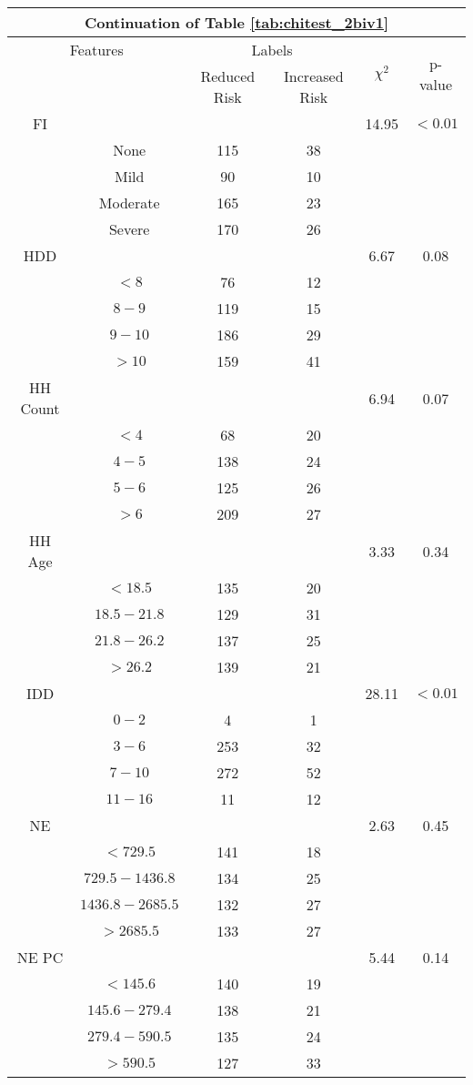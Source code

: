 \begin{table}
\centering
\label{tab:chitest_2biv1_cont}
\begin{tabular}{c c | c c| c | c}
\hline
\multicolumn{6}{c}{Continuation of Table \ref{tab:chitest_2biv1}}\\ 
\hline
\multicolumn{2}{c|}{Features}& \multicolumn{2}{c|}{Labels}& \multirow{2}{*}{$\chi^2$} & \multirow{2}{*}{p-value}\\ 
& & Reduced Risk & Increased Risk & & \\ 
\hline
FI &  &  & & 14.95 & $< 0.01$ \\ 
& None & 115 & 38& & \\ 
& Mild & 90 & 10& & \\ 
& Moderate & 165 & 23& & \\ 
& Severe & 170 & 26& & \\ 
\hline 
HDD &  &  & & 6.67 & 0.08 \\ 
& $< 8$ & 76 & 12& & \\ 
& $8-9$ & 119 & 15& & \\ 
& $9-10$ & 186 & 29& & \\ 
& $> 10$ & 159 & 41& & \\ 
\hline 
HH Count &  &  & & 6.94 & 0.07 \\ 
& $< 4$ & 68 & 20& & \\ 
& $4-5$ & 138 & 24& & \\ 
& $5-6$ & 125 & 26& & \\ 
& $> 6$ & 209 & 27& & \\ 
\hline 
HH Age &  &  & & 3.33 & 0.34 \\ 
& $< 18.5$ & 135 & 20& & \\ 
& $18.5-21.8$ & 129 & 31& & \\ 
& $21.8-26.2$ & 137 & 25& & \\ 
& $> 26.2$ & 139 & 21& & \\ 
\hline 
IDD &  &  & & 28.11 & $< 0.01$ \\ 
& $0-2$ & 4 & 1& & \\ 
& $3-6$ & 253 & 32& & \\ 
& $7-10$ & 272 & 52& & \\ 
& $11-16$ & 11 & 12& & \\ 
\hline 
NE &  &  & & 2.63 & 0.45 \\ 
& $< 729.5$ & 141 & 18& & \\ 
& $729.5-1436.8$ & 134 & 25& & \\ 
& $1436.8-2685.5$ & 132 & 27& & \\ 
& $> 2685.5$ & 133 & 27& & \\ 
\hline 
NE PC &  &  & & 5.44 & 0.14 \\ 
& $< 145.6$ & 140 & 19& & \\ 
& $145.6-279.4$ & 138 & 21& & \\ 
& $279.4-590.5$ & 135 & 24& & \\ 
& $> 590.5$ & 127 & 33& & \\ 
\hline 
\end{tabular}
\end{table}

